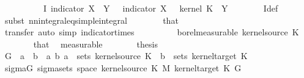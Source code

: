 \begin{isabellebody}
\ \ \isamarkupfalse%
\ {\isacharminus}{\kern0pt}\isanewline
\ \ \ \ \isamarkupfalse%
\ {\isachardoublequoteopen}I\ {\isacharparenleft}{\kern0pt}indicator\ {\isacharparenleft}{\kern0pt}X\ {\isasymtimes}\ Y{\isacharparenright}{\kern0pt}{\isacharparenright}{\kern0pt}\ {\isacharequal}{\kern0pt}\ {\isacharparenleft}{\kern0pt}{\isasymlambda}{\isasymomega}\ indicator\ X\ {\isasymomega}\ {\isacharasterisk}{\kern0pt}\ kernel\ K\ {\isasymomega}\ Y{\isacharparenright}{\kern0pt}{\isachardoublequoteclose}\isanewline
\ \ \ \ \ \ \isamarkupfalse%
\ I{\isacharunderscore}{\kern0pt}def\ \isamarkupfalse%
\ {\isacharparenleft}{\kern0pt}subst\ nn{\isacharunderscore}{\kern0pt}integral{\isacharunderscore}{\kern0pt}eq{\isacharunderscore}{\kern0pt}simple{\isacharunderscore}{\kern0pt}integral{\isacharparenright}{\kern0pt}\isanewline
\ \ \ \ \ \ \isamarkupfalse%
\ that\ \isamarkupfalse%
\ {\isacharparenleft}{\kern0pt}transfer{\isacharcomma}{\kern0pt}\ auto\ simp{\isacharcolon}{\kern0pt}\ indicator{\isacharunderscore}{\kern0pt}times{\isacharparenright}{\kern0pt}\isanewline
\ \ \ \ \isamarkupfalse%
\ \isamarkupfalse%
\ {\isachardoublequoteopen}{\isachardot}{\kern0pt}{\isachardot}{\kern0pt}{\isachardot}{\kern0pt}\ {\isasymin}\ borel{\isacharunderscore}{\kern0pt}measurable\ {\isacharparenleft}{\kern0pt}kernel{\isacharunderscore}{\kern0pt}source\ K{\isacharparenright}{\kern0pt}{\isachardoublequoteclose}\isanewline
\ \ \ \ \ \ \isamarkupfalse%
\ that\ \isamarkupfalse%
\ measurable\isanewline
\ \ \ \ \isamarkupfalse%
\ \isamarkupfalse%
\ {\isacharquery}{\kern0pt}thesis\ \isacommand{{\isachardot}{\kern0pt}}\isamarkupfalse%
\isanewline
\ \ \isamarkupfalse%
\isanewline
\ \ \isamarkupfalse%
\ {\isacharquery}{\kern0pt}G\ {\isacharequal}{\kern0pt}\ {\isachardoublequoteopen}{\isacharbraceleft}{\kern0pt}a\ {\isasymtimes}\ b\ {\isacharbar}{\kern0pt}\ a\ b{\isachardot}{\kern0pt}\ a\ {\isasymin}\ sets\ {\isacharparenleft}{\kern0pt}kernel{\isacharunderscore}{\kern0pt}source\ K{\isacharparenright}{\kern0pt}\ {\isasymand}\ b\ {\isasymin}\ sets\ {\isacharparenleft}{\kern0pt}kernel{\isacharunderscore}{\kern0pt}target\ K{\isacharparenright}{\kern0pt}{\isacharbraceright}{\kern0pt}{\isachardoublequoteclose}\isanewline
\ \ \isamarkupfalse%
\ sigma{\isacharunderscore}{\kern0pt}G{\isacharcolon}{\kern0pt}\ {\isachardoublequoteopen}sigma{\isacharunderscore}{\kern0pt}sets\ {\isacharparenleft}{\kern0pt}space\ {\isacharparenleft}{\kern0pt}kernel{\isacharunderscore}{\kern0pt}source\ K\ {\isasymOtimes}\isactrlsub M\ kernel{\isacharunderscore}{\kern0pt}target\ K{\isacharparenright}{\kern0pt}{\isacharparenright}{\kern0pt}\ {\isacharquery}{\kern0pt}G\ {\isacharequal}{\kern0pt}\isanewline

\end{isabellebody}
